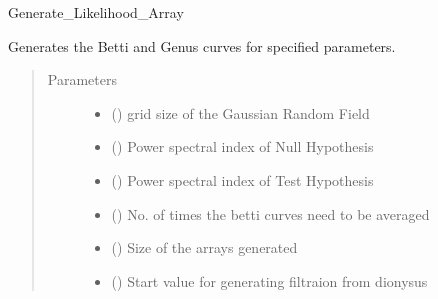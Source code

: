 \documentclass[letterpaper,10pt,english]{sphinxmanual}
\begin{document}
\begin{fulllineitems}
\label{\detokenize{utilities:utilities.Generate_BettiGenus_array}}
\sphinxAtStartPar
Generate\_Likelihood\_Array

\sphinxAtStartPar
Generates the Betti and Genus curves for specified parameters.
\begin{quote}\begin{description}
\item[{Parameters}] \leavevmode\begin{itemize}
\item {} 
\sphinxAtStartPar
{} () \textendash{} grid size of the Gaussian Random Field

\item {} 
\sphinxAtStartPar
{} () \textendash{} Power spectral index of Null Hypothesis

\item {} 
\sphinxAtStartPar
{} () \textendash{} Power spectral index of Test Hypothesis

\item {} 
\sphinxAtStartPar
{} () \textendash{} No. of times the betti curves need to be averaged

\item {} 
\sphinxAtStartPar
{} () \textendash{} Size of the arrays generated

\item {} 
\sphinxAtStartPar
{} () \textendash{} Start value for generating filtraion from dionysus


\end{itemize}
\end{description}
\end{quote}
\end{fulllineitems}
\end{document}
